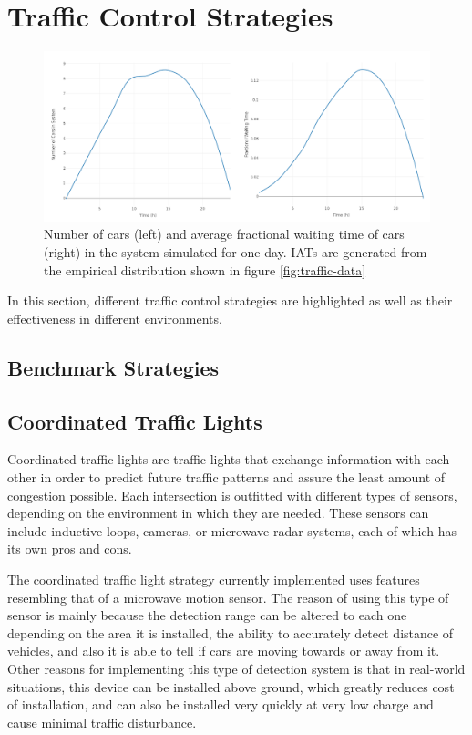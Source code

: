 \documentclass[10pt]{article}
\begin{document}
\section{Traffic Control Strategies}

\begin{figure}[htb]
	\includegraphics[width=\textwidth]{img/validation.png}
	\caption{Number of cars (left) and average fractional waiting time of cars (right) in the system simulated for one day. IATs are generated from the empirical distribution shown in figure \ref{fig:traffic-data} \label{fig:validation}}
\end{figure}

\label{sec:strategies}
In this section, different traffic control strategies are highlighted as well as their effectiveness in different environments.

\subsection{Benchmark Strategies}

\subsection{Coordinated Traffic Lights}
Coordinated traffic lights are traffic lights that exchange information with each other in order to predict future traffic patterns and assure the least amount of congestion possible.  Each intersection is outfitted with different types of sensors, depending on the environment in which they are needed.  These sensors can include inductive loops, cameras, or microwave radar systems, each of which has its own pros and cons.

The coordinated traffic light strategy currently implemented uses features resembling that of a microwave motion sensor.  The reason of using this type of sensor is mainly because the detection range can be altered to each one depending on the area it is installed, the ability to accurately detect distance of vehicles, and also it is able to tell if cars are moving towards or away from it.  Other reasons for implementing this type of detection system is that in real-world situations, this device can be installed above ground, which greatly reduces cost of installation, and can also be installed very quickly at very low charge and cause minimal traffic disturbance.
\end{document}
